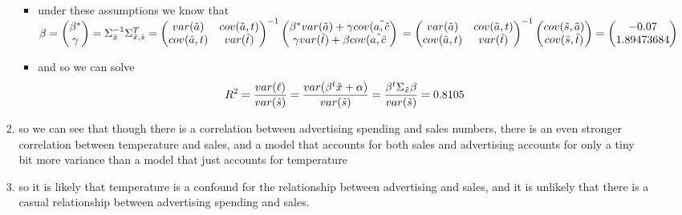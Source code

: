 \documentclass[12pt,twoside]{article}
\begin{document}
\begin{enumerate}
\begin{itemize}
\begin{enumerate}
\begin{itemize}
            \item under these assumptions we know that $\beta = 
            \begin{pmatrix}
                \beta^{*}\\\gamma
            \end{pmatrix}= \Sigma_{\Tilde{x}}^{-1}\Sigma_{\Tilde{x}, \Tilde{s}}^{T}\\=\begin{pmatrix}
                var(\Tilde{a}) & cov(\Tilde{a}, t)\\
                cov(\Tilde{a}, t) & var(\Tilde{t})
            \end{pmatrix}^{-1} \begin{pmatrix}
                \beta^{*}var(\Tilde{a}) + \gamma cov(\Tilde{a,\Tilde{c}}\\ 
                \gamma var(\Tilde{t}) + \beta cov(\Tilde{a,\Tilde{c}}
            \end{pmatrix}\\ =\begin{pmatrix}
                var(\Tilde{a}) & cov(\Tilde{a}, t)\\
                cov(\Tilde{a}, t) & var(\Tilde{t})
            \end{pmatrix}^{-1} \begin{pmatrix}
                cov(\Tilde{s}, \Tilde{a})\\ 
                cov(\Tilde{s}, \Tilde{t})
            \end{pmatrix}=\begin{pmatrix}
                {-0.07}\\{1.89473684}
            \end{pmatrix}$
            \item and so we can solve $$R^2= \frac{var(\ell )}{var(\Tilde{s})}=\frac{var(\beta^t\Tilde{x}+\alpha)}{var(\Tilde{s})}=\frac{\beta^t\Sigma_{\Tilde{x}}\beta}{var(\Tilde{s})} = 0.8105$$
        \end{itemize}
        \item so we can see that though there is a correlation between advertising spending and sales numbers, there is an even stronger correlation between temperature and sales, and a model that accounts for both sales and advertising accounts for only a tiny bit more variance than a model that just accounts for temperature 
        \item so it is likely that temperature is a confound for the relationship between advertising and sales, and it is unlikely that there is a casual relationship between advertising spending and sales. 
        

\end{enumerate}
\end{itemize}
\end{enumerate}
\end{document}
